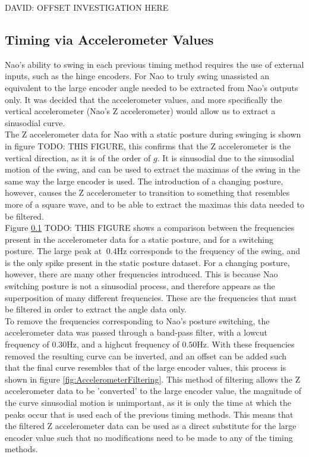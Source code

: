 \documentclass[11pt]{article}
\newcommand*\ruleline[1]{\par\noindent\raisebox{.8ex}{\makebox[\linewidth]{\hrulefill\hspace{1ex}\raisebox{-.8ex}{#1}\hspace{1ex}\hrulefill}}}
\begin{document}
DAVID: OFFSET INVESTIGATION HERE

\subsection{Timing via Accelerometer Values}
\ruleline{George Sheppard}
Nao's ability to swing in each previous timing method requires the use of external inputs, such as the hinge encoders. For Nao to truly swing unassisted an equivalent to the large encoder angle needed to be extracted from Nao's outputs only. It was decided that the accelerometer values, and more specifically the vertical accelerometer (Nao's Z accelerometer) would allow us to extract a sinusodial curve.\\

The Z accelerometer data for Nao with a static posture during swinging is shown in figure TODO: THIS FIGURE, this confirms that the Z accelerometer is the vertical direction, as it is of the order of $g$. It is sinusodial due to the sinusodial motion of the swing, and can be used to extract the maximas of the swing in the same way the large encoder is used. The introduction of a changing posture, however, causes the Z accelerometer to transition to something that resembles more of a square wave, and to be able to extract the maximas this data needed to be filtered.\\

Figure \ref{} TODO: THIS FIGURE shows a comparison between the frequencies present in the accelerometer data for a static posture, and for a switching posture. The large peak at $~0.4$Hz corresponds to the frequency of the swing, and is the only spike present in the static posture dataset. For a changing posture, however, there are many other frequencies introduced. This is because Nao switching posture is not a sinusodial process, and therefore appears as the superposition of many different frequencies. These are the frequencies that must be filtered in order to extract the angle data only.\\

To remove the frequencies corresponding to Nao's posture switching, the accelerometer data was passed through a band-pass filter, with a lowcut frequency of $0.30$Hz, and a highcut frequency of $0.50$Hz. With these frequencies removed the resulting curve can be inverted, and an offset can be added such that the final curve resembles that of the large encoder values, this process is shown in figure \ref{fig:AccelerometerFiltering}. This method of filtering allows the Z accelerometer data to be 'converted' to the large encoder value, the magnitude of the curve sinusodial motion is unimportant, as it is only the time at which the peaks occur that is used each of the previous timing methods. This means that the filtered Z accelerometer data can be used as a direct substitute for the large encoder value such that no modifications need to be made to any of the timing methods.\\
\end{document}
